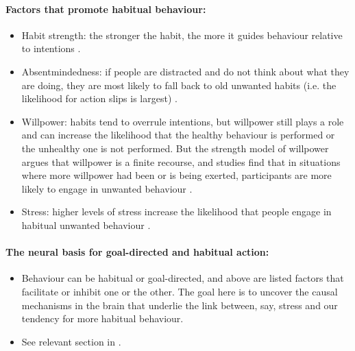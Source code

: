 \documentclass[a4paper, 11pt]{report}
\begin{document}
\paragraph{Factors that promote habitual behaviour:}

\begin{itemize}
	\item Habit strength: the stronger the habit, the more it guides behaviour relative to intentions \citep{ji2007purchase, danner2008habit, de2009adult}.

	\item Absentmindedness: if people are distracted and do not think about what they are doing, they are most likely to fall back to old unwanted habits (i.e. the likelihood for action slips is largest) \citet{norman1981categorization, reason1992cognitive}.

	\item Willpower: habits tend to overrule intentions, but willpower still plays a role and can increase the likelihood that the healthy behaviour is performed or the unhealthy one is not performed. But the strength model of willpower \citep{baumeister1996self, baumeister2000ego} argues that willpower is a finite recourse, and studies find that in situations where more willpower had been or is being exerted, participants are more likely to engage in unwanted behaviour \citep{hagger2010ego, muraven2002self, shmueli2009resisting, muraven2005daily}.

	\item Stress: higher levels of stress increase the likelihood that people engage in habitual unwanted behaviour \citep{schwabe2013stress}.
\end{itemize}

\paragraph{The neural basis for goal-directed and habitual action:}

\begin{itemize}
	\item Behaviour can be habitual or goal-directed, and above are listed factors that facilitate or inhibit one or the other. The goal here is to uncover the causal mechanisms in the brain that underlie the link between, say, stress and our tendency for more habitual behaviour.

	\item See relevant section in \citet{runger2015maintenance}.
\end{itemize}
\end{document}
